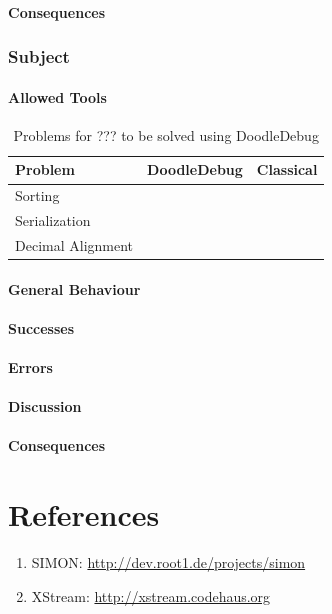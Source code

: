 \documentclass[a4paper,ngerman,english]{amsbook} %
\begin{document}
\subsubsection*{Consequences}

\subsection*{Subject}
\subsubsection*{Allowed Tools}
\begin{table}[h]
\centering
\begin{tabular}{l c c}
{\bf Problem} & {\bf DoodleDebug} & {\bf Classical} \\ \hline
Sorting &  &  \\
Serialization &  &  \\
Decimal Alignment &  &  \\
\end{tabular}
\caption{Problems for ??? to be solved using DoodleDebug}
\end{table}
\subsubsection*{General Behaviour}
\subsubsection*{Successes}
\subsubsection*{Errors}
\subsubsection*{Discussion}
\subsubsection*{Consequences}

\chapter*{References}
\begin{enumerate}
\item
SIMON: \url{http://dev.root1.de/projects/simon}
\item
XStream: \url{http://xstream.codehaus.org}
\end{enumerate}
\end{document}
